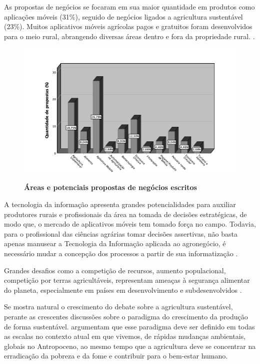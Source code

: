 As propostas de negócios se focaram em sua maior quantidade em produtos como aplicações móveis (31\%), seguido de negócios ligados a agricultura sustentável (23\%). Muitos aplicativos móveis agrícolas pagos e gratuitos foram desenvolvidos para o meio rural, abrangendo diversas áreas dentro e fora da propriedade rural. \cite{silva_caracterizacao_2017}. 




\begin{figure}[H]
\centering
\caption{\textbf{Áreas e potenciais propostas de negócios escritos}}
\includegraphics[scale=0.6]{Imagens/propostas_negocios.png}
\label{figura_11}
\end{figure}


A tecnologia da informação apresenta grandes potencialidades para auxiliar produtores rurais e profissionais da área na tomada de decisões estratégicas, de modo que, o mercado de aplicativos móveis tem tomado força no campo. Todavia, para o profissional das ciências agrárias tomar decisões assertivas, não basta apenas manusear a Tecnologia da Informação aplicada ao agronegócio, é necessário mudar a concepção dos processos a partir de sua informatização \cite{ferraz_tecnologia_2017,sharma_systematic_2020}.

Grandes desafios como a competição de recursos, aumento populacional, competição por terras agricultáveis, representam ameaças à segurança alimentar do planeta, especialmente em países em desenvolvimento e subdesenvolvidos \cite{pardey_bounds_2014}.

Se mostra natural o crescimento do debate sobre a agricultura sustentável, perante as crescentes discussões sobre o paradigma do crescimento da produção de forma sustentável.
 argumentam que esse paradigma deve ser definido em todas as escalas no contexto atual em que vivemos, de rápidas mudanças ambientais, globais no Antropoceno, ao mesmo tempo que a agricultura  deve se concentrar na erradicação da pobreza e da fome e contribuir para o bem-estar humano.


